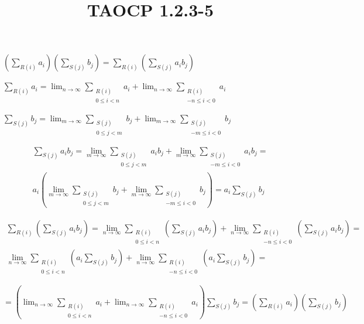 \documentclass{article}
\title{TAOCP 1.2.3\mbox{-}5}
\begin{document}
\maketitle

\( (\sum_{R(i)}a_{i})(\sum_{S(j)}b_{j}) = \sum_{R(i)}(\sum_{S(j)}{a_{i}b_{j}}) \)

\( \sum_{R(i)}a_{i} = \lim_{n\to\infty}\sum_{\substack{R(i)\\0 \leq i < n}}a_{i} + \lim_{n\to\infty}\sum_{\substack{R(i)\\-n \leq i < 0}}a_{i} \)

\( \sum_{S(j)}b_{j} = \lim_{m\to\infty}\sum_{\substack{S(j)\\0 \leq j < m}}b_{j} + \lim_{m\to\infty}\sum_{\substack{S(j)\\-m \leq i < 0}}b_{j} \)

\begin{multline*}
\sum_{S(j)}a_{i}b_{j} = \lim_{m\to\infty}\sum_{\substack{S(j)\\0 \leq j < m}}a_{i}b_{j} + \lim_{m\to\infty}\sum_{\substack{S(j)\\-m \leq i < 0}}a_{i}b_{j} = \\
a_{i} (\lim_{m\to\infty}\sum_{\substack{S(j)\\0 \leq j < m}}b_{j} + \lim_{m\to\infty}\sum_{\substack{S(j)\\-m \leq i < 0}}b_{j}) = a_{i} \sum_{S(j)}b_{j}
\end{multline*}

\begin{multline*}
\sum_{R(i)}(\sum_{S(j)}{a_{i}b_{j}}) = \lim_{n\to\infty}\sum_{\substack{R(i)\\0 \leq i < n}}(\sum_{S(j)}{a_{i}b_{j}}) + \lim_{n\to\infty}\sum_{\substack{R(i)\\-n \leq i < 0}}(\sum_{S(j)}{a_{i}b_{j}}) = \\
\lim_{n\to\infty}\sum_{\substack{R(i)\\0 \leq i < n}}(a_{i}\sum_{S(j)}{b_{j}}) + \lim_{n\to\infty}\sum_{\substack{R(i)\\-n \leq i < 0}}(a_{i}\sum_{S(j)}{b_{j}}) {} =
\end{multline*}

\( = (\lim_{n\to\infty}\sum_{\substack{R(i)\\0 \leq i < n}}a_{i} + \lim_{n\to\infty}\sum_{\substack{R(i)\\-n \leq i < 0}}a_{i})\sum_{S(j)}{b_{j}} = (\sum_{R(i)}a_{i})(\sum_{S(j)}b_{j}) \)
\end{document}
